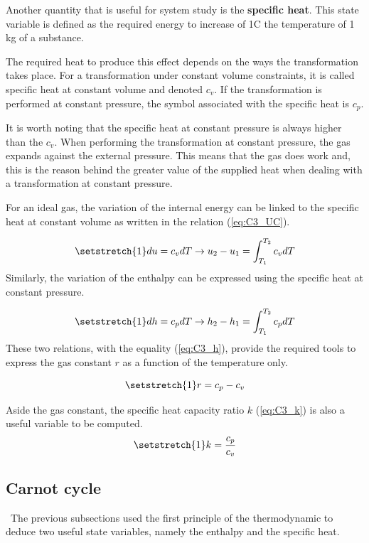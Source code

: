 Another quantity that is useful for system study is the \textbf{specific heat}. This state variable is defined as the required energy to increase of 1\degree C the temperature of 1 kg of a substance. 
 
The required heat to produce this effect depends on the ways the transformation takes place. For a transformation under constant volume constraints, it is called specific heat at constant volume and denoted $c_v$. If the transformation is performed at constant pressure, the symbol associated with the specific heat is $c_p$.

It is worth noting that the specific heat at constant pressure is always higher than the $c_v$. When performing the transformation at constant pressure, the gas expands against the external pressure. This means that the gas does work and, this is the reason behind the greater value of the supplied heat when dealing with a transformation at constant pressure. 

For an ideal gas, the variation of the internal energy can be linked to the specific heat at constant volume as written in the relation (\ref{eq:C3_UC}).

\begin{equation}
\setstretch{1}
du = c_vdT \rightarrow u_2 - u_1 = \int_{T_1}^{T_2} c_vdT\label{eq:C3_UC}
\end{equation} 
Similarly, the variation of the enthalpy can be expressed using the specific heat at constant pressure.

\begin{equation}
\setstretch{1}
dh = c_pdT \rightarrow h_2 - h_1 = \int_{T_1}^{T_2} c_pdT\label{eq:C3_UP}
\end{equation} 
These two relations, with the equality (\ref{eq:C3_h}), provide the required tools to express the gas constant $r$ as a function of the temperature only. 

\begin{equation}
\setstretch{1}
r = c_p - c_v \label{eq:C3_r}
\end{equation}

Aside the gas constant, the specific heat capacity ratio $k$ (\ref{eq:C3_k}) is also a useful variable to be computed.
\begin{equation}
\setstretch{1}
k = \frac{c_p}{c_v} \label{eq:C3_k}
\end{equation}
\subsection{Carnot cycle}
\quad\, The previous subsections used the first principle of the thermodynamic to deduce two useful state variables, namely the enthalpy and the specific heat.

